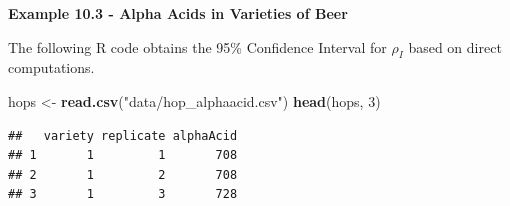\documentclass[
]{book}
\newenvironment{Shaded}{\begin{snugshade}}{\end{snugshade}}
\newcommand{\DecValTok}[1]{\textcolor[rgb]{0.00,0.00,0.81}{#1}}
\newcommand{\FunctionTok}[1]{\textcolor[rgb]{0.13,0.29,0.53}{\textbf{#1}}}
\newcommand{\NormalTok}[1]{#1}
\newcommand{\OtherTok}[1]{\textcolor[rgb]{0.56,0.35,0.01}{#1}}
\newcommand{\StringTok}[1]{\textcolor[rgb]{0.31,0.60,0.02}{#1}}
\begin{document}
\textbf{Example 10.3 - Alpha Acids in Varieties of Beer}

The following R code obtains the 95\% Confidence Interval for \(\rho_I\)
based on direct computations.

\begin{Shaded}
\begin{Highlighting}[]
\NormalTok{hops }\OtherTok{\textless{}{-}} \FunctionTok{read.csv}\NormalTok{(}\StringTok{"data/hop\_alphaacid.csv"}\NormalTok{)}
\FunctionTok{head}\NormalTok{(hops, }\DecValTok{3}\NormalTok{)}
\end{Highlighting}
\end{Shaded}

\begin{verbatim}
##   variety replicate alphaAcid
## 1       1         1       708
## 2       1         2       708
## 3       1         3       728
\end{verbatim}
\end{document}
